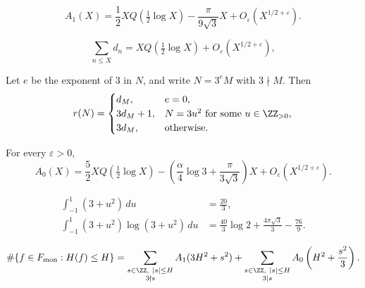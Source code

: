 \begin{equation}\label{eqn:A1asymptotic} A_1(X) =\frac12XQ\left(\tfrac12\log X\right) -\frac{\pi}{9\sqrt3}X +O_\varepsilon(X^{1/2+\varepsilon}). \end{equation}

\begin{equation}\label{eqn:dSummatoryForGeneralTrace} \sum_{n\leq X}d_n =XQ\left(\tfrac12\log X\right) +O_\varepsilon(X^{1/2+\varepsilon}), \end{equation}

\begin{lemma}\label{lemma:traceZeroCoefficients} Let $e$ be the exponent of $3$ in $N$, and write $N=3^eM$ with $3\nmid M$. Then \[ r(N)= \begin{cases} d_M,&e=0,\\ 3d_M+1,&N=3u^2\text{ for some }u\in\ZZ_{>0},\\ 3d_M,&\text{otherwise}. \end{cases} \] \end{lemma}

\begin{proposition}\label{prop:traceZeroAsymptotic} For every $\varepsilon>0$, \[ A_0(X) =\frac52XQ\left(\tfrac12\log X\right) -\left(\frac{\alpha}{4}\log3+\frac{\pi}{3\sqrt3}\right)X +O_\varepsilon(X^{1/2+\varepsilon}). \] \end{proposition}

\begin{equation}\label{eqn:monicArchimedeanMoments} \begin{aligned} \int_{-1}^1(3+u^2)\,du&=\frac{20}{3},\\ \int_{-1}^1(3+u^2)\log(3+u^2)\,du &=\frac{40}{3}\log2+\frac{4\pi\sqrt3}{3}-\frac{76}{9}. \end{aligned} \end{equation}

\begin{align} \#\{f\in F_{\mathrm{mon}}:H(f)\leq H\} =\sum_{\substack{s\in\ZZ,\ |s|\leq H\\3\nmid s}} A_1(3H^2+s^2) +\sum_{\substack{s\in\ZZ,\ |s|\leq H\\3\mid s}} A_0\left(H^2+\frac{s^2}{3}\right). \label{eqn:generalTraceDecomposition} \end{align}

